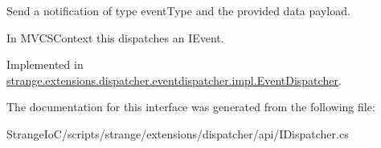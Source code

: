 Send a notification of type event\-Type and the provided data payload. 

In M\-V\-C\-S\-Context this dispatches an I\-Event. 

Implemented in \hyperlink{classstrange_1_1extensions_1_1dispatcher_1_1eventdispatcher_1_1impl_1_1_event_dispatcher_a14124806e6632e75aa0ff0c02d23483b}{strange.\-extensions.\-dispatcher.\-eventdispatcher.\-impl.\-Event\-Dispatcher}.



The documentation for this interface was generated from the following file\-:\begin{DoxyCompactItemize}
\item 
Strange\-Io\-C/scripts/strange/extensions/dispatcher/api/I\-Dispatcher.\-cs\end{DoxyCompactItemize}
